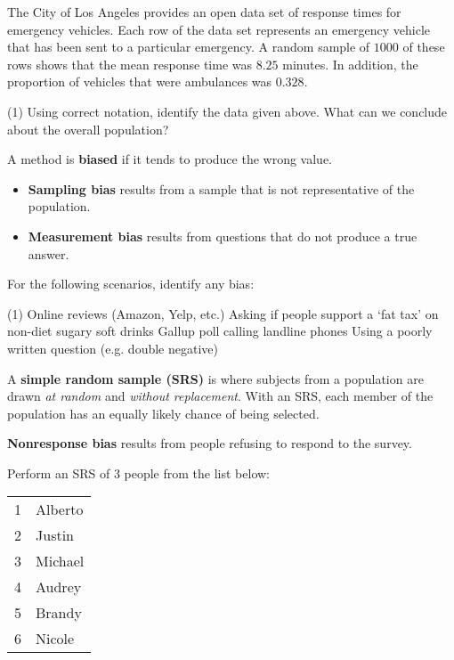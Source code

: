 \documentclass[../mathNotesPreamble]{subfiles}
\begin{document}
  \begin{ex*}
    The City of Los Angeles provides an open data set of response times for emergency vehicles. Each row of the data set represents an emergency vehicle that has been sent to a particular emergency. A random sample of $1000$ of these rows shows that the mean response time was $8.25$ minutes. In addition, the proportion of vehicles that were ambulances was $0.328$.
  \end{ex*}
  \begin{extasks}[after-item-skip=\stretch{1}](1)
    \task Using correct notation, identify the data given above.
    \task What can we conclude about the overall population?
  \end{extasks}
  \pagebreak

  \begin{defn*}
    A method is \textbf{biased} if it tends to produce the wrong value.
    \begin{itemize}
      \item \textbf{Sampling bias} results from a sample that is not representative of the population.
      \item \textbf{Measurement bias} results from questions that do not produce a true answer.
    \end{itemize}
  \end{defn*}
  \begin{ex*}
    For the following scenarios, identify any bias:
  \end{ex*}
  \begin{extasks}[after-item-skip=\stretch{1}](1)
    \task Online reviews (Amazon, Yelp, etc.)
    \task Asking if people support a `fat tax' on non-diet sugary soft drinks
    \task Gallup poll calling landline phones
    \task Using a poorly written question (e.g. double negative)
  \end{extasks}
  \pagebreak

  \begin{defn*}
    A \textbf{simple random sample (SRS)} is where subjects from a population are drawn \emph{at random} and \emph{without replacement}. With an SRS, each member of the population has an equally likely chance of being selected.

    \textbf{Nonresponse bias} results from people refusing to respond to the survey.
  \end{defn*}
  \begin{ex*}
    Perform an SRS of $3$ people from the list below:
    \begin{center}
      \begin{tabular}{@{}ll@{}}\toprule
        1& Alberto\\ 2& Justin\\3& Michael\\4& Audrey\\5& Brandy\\6& Nicole\\\bottomrule
      \end{tabular}
    \end{center}
  \end{ex*}
  \pagebreak

  \pagebreak
\end{document}
